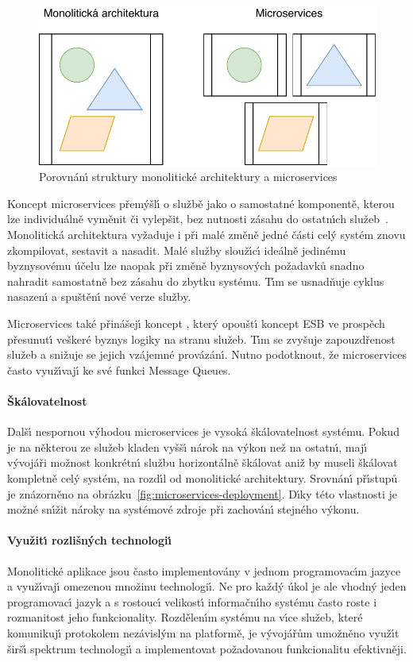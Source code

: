 \begin{figure}
    \centering
    \includegraphics[keepaspectratio=true, width=0.5\linewidth]{figures/monolith-vs-microservices.pdf}
    \caption{Porovnán\'{\i} struktury monolitické architektury a microservices}
    \label{fig:monolith-vs-microservices}
\end{figure}

Koncept microservices přem\'yšl\'{\i} o službě jako o samostatné komponentě,
kterou lze individuálně vyměnit či vylepšit, bez nutnosti zásahu do
ostatn\'{\i}ch služeb~\cite{lewis2014microservices}. Monolitická architektura
vyžaduje i při malé změně jedné části cel\'y systém znovu zkompilovat, sestavit
a nasadit. Malé služby slouž\'{\i}c\'{\i} ideálně jedinému byznysovému účelu lze naopak
při změně byznysov\'ych požadavků snadno nahradit samostatně bez zásahu do zbytku
systému. T\'{\i}m se usnadňuje cyklus nasazen\'{\i} a spuštěn\'{\i} nové verze služby.

Microservices také přinášej\'{\i} koncept ,
kter\'y opoušt\'{\i} koncept \gls{ESB} ve prospěch přesunut\'{\i} veškeré byznys logiky
na stranu služeb. T\'{\i}m se zvyšuje zapouzdřenost služeb a snižuje se
jejich vzájemné provázán\'{\i}. Nutno podotknout, že microservices často
využ\'{\i}vaj\'{\i} ke své funkci Message Queues.

\paragraph{Škálovatelnost}
Dalš\'{\i} nespornou v\'yhodou microservices je vysoká škálovatelnost systému. Pokud je na
některou ze služeb kladen vyšš\'{\i} nárok na v\'ykon než na ostatn\'{\i}, maj\'{\i}
v\'yvojáři možnost konkrétn\'{\i} službu horizontálně škálovat aniž by
museli škálovat kompletně cel\'y systém, na rozd\'{\i}l od monolitické architektury.
Srovnán\'{\i} př\'{\i}stupů je znázorněno na obrázku~\ref{fig:microservices-deployment}.
D\'{\i}ky této vlastnosti je možné sn\'{\i}žit nároky na systémové zdroje při zachován\'{\i}
stejného v\'ykonu.

\paragraph{Využit\'{\i} rozlišn\'ych technologi\'{\i}}
Monolitické aplikace jsou často implementovány v jednom programovac\'{\i}m jazyce
a využ\'{\i}vaj\'{\i} omezenou množinu technologi\'{\i}. Ne pro každ\'y úkol je ale vhodn\'y
jeden programovac\'{\i} jazyk a s rostouc\'{\i} velikost\'{\i} informačn\'{\i}ho systému často roste
i rozmanitost jeho funkcionality. Rozdělen\'{\i}m systému na v\'{\i}ce služeb, které
komunikuj\'{\i} protokolem nezávisl\'ym na platformě, je v\'yvojářům umožněno využ\'{\i}t
širš\'{\i} spektrum technologi\'{\i} a implementovat požadovanou funkcionalitu
efektivněji.

